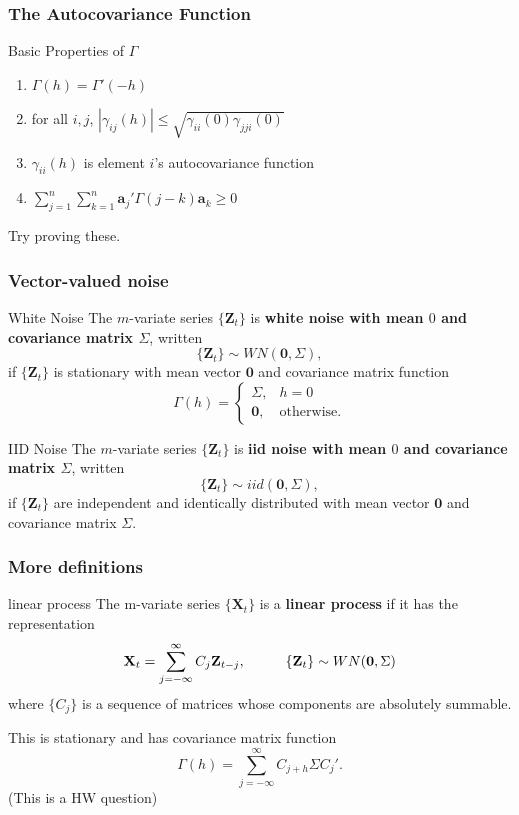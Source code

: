 \documentclass{beamer}
\begin{document}
\begin{frame}
\frametitle{The Autocovariance Function}


\begin{block}{Basic Properties of $\Gamma$}
\begin{enumerate}
\item $\Gamma(h) = \Gamma'(-h)$
\item for all $i,j$, $|\gamma_{ij}(h)| \le \sqrt{\gamma_{ii}(0)\gamma_{jji}(0)}$ 
\item $\gamma_{ii}(h)$ is element $i$'s autocovariance function
\item $\sum_{j=1}^n\sum_{k=1}^n \mathbf{a}_j' \Gamma(j-k) \mathbf{a}_k \ge 0$
\end{enumerate}
\end{block}
Try proving these.
\end{frame}


\begin{frame}
\frametitle{Vector-valued noise}

\begin{block}{White Noise}
The $m$-variate series $\{\mathbf{Z}_t\}$ is {\bf white noise with mean $0$ and covariance matrix $\Sigma$}, written
\[
\{\mathbf{Z}_t\} \sim WN(\mathbf{0},\Sigma),
\]
if $\{\mathbf{Z}_t\}$ is stationary with mean vector $\mathbf{0}$ and covariance matrix function
\[
\Gamma(h) = 
\begin{cases}
\Sigma, & h=0 \\
\mathbf{0}, & \text{otherwise}.
\end{cases}
\]
\end{block}
\begin{block}{IID Noise}
The $m$-variate series $\{\mathbf{Z}_t\}$ is {\bf iid noise with mean $0$ and covariance matrix $\Sigma$}, written
\[
\{\mathbf{Z}_t\} \sim iid(\mathbf{0},\Sigma),
\]
if $\{\mathbf{Z}_t\}$ are independent and identically distributed with mean vector $\mathbf{0}$ and covariance matrix $\Sigma$.
\end{block}

\end{frame}


\begin{frame}
\frametitle{More definitions}

\begin{block}{linear process}
The m-variate series $\{\mathbf{X}_t\}$ is a {\bf linear process} if it has the representation
\[
\mathbf{X}_t = \sum_{j=-\infty}^{\infty}C_j \mathbf{Z}_{t-j}, \hspace{10mm} \{\mathbf{Z}_t\} \sim WN(\mathbf{0},\Sigma)
\]
where $\{C_j\}$ is a sequence of matrices whose components are absolutely summable.
\end{block}

This is stationary and has covariance matrix function 
\[
\Gamma(h) = \sum_{j=-\infty}^{\infty}C_{j+h}\Sigma C_j'.
\]
(This is a HW question)

\end{frame}
\end{document}
